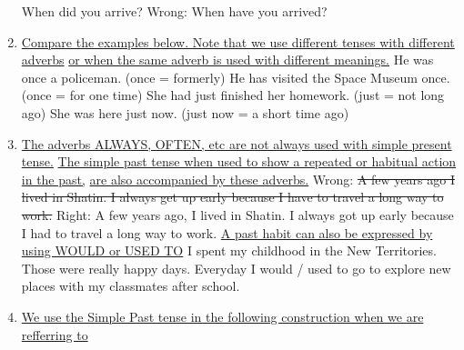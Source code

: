 \begin{enumerate}
        When did you arrive?
        \newline
        \newline
        Wrong: When have you arrived?
    \item \underline{Compare the examples below. Note that we use different
        tenses with different adverbs}
        \newline
        \underline{or when the same adverb is used with different meanings.}
        \newline
        \newline
        He was once a policeman. (once = formerly)
        \newline
        \newline
        He has visited the Space Museum once. (once = for one time)
        \newline
        \newline
        She had just finished her homework. (just = not long ago)
        \newline
        \newline
        She was here just now. (just now = a short time ago)
    \item \underline{The adverbs ALWAYS, OFTEN, etc are not always used with
        simple present tense.}
        \newline
        \underline{The simple past tense when used to show a repeated or
        habitual action in the past,}
        \underline{are also accompanied by these adverbs.}
        \newline
        \newline
        Wrong: \st{A few years ago I lived in Shatin. I always get up early
        because I have to travel a long way to work.}
        \newline
        \newline
        Right: A few years ago, I lived in Shatin. I always got up early because
        I had to travel a long way to work.
        \newline
        \newline
        \underline{A past habit can also be expressed by using WOULD or USED TO}
        \newline
        I spent my childhood in the New Territories. Those were really happy
        days. Everyday I would / used to go to explore new places with my
        classmates after school.
    \item \underline{We use the Simple Past tense in the following construction
        when we are refferring to}

\end{enumerate}
